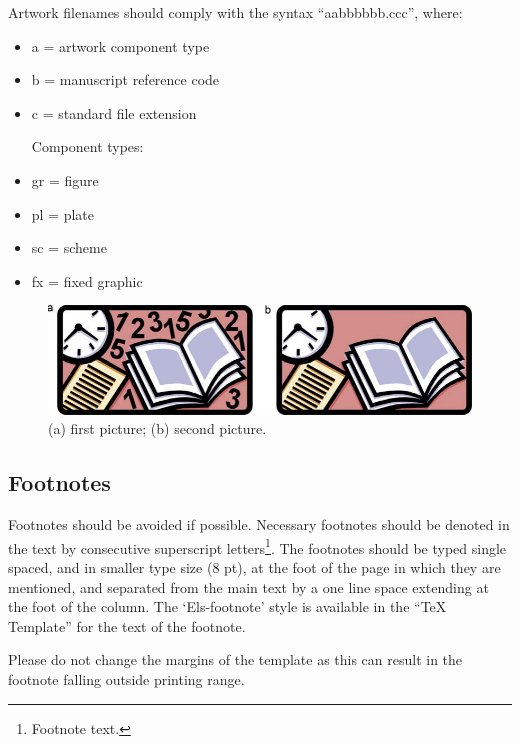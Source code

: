 \documentclass[5p,times,procedia]{elsarticle}
\begin{document}
Artwork filenames should comply with the syntax ``aabbbbbb.ccc'', where:
\begin{itemize}
\item a = artwork component type
\item b = manuscript reference code
\item c = standard file extension

Component types:
\item gr = figure
\item pl = plate
\item sc = scheme
\item fx = fixed graphic
\end{itemize}

\begin{figure}[t]\vspace*{4pt}
\centerline{\includegraphics{gr1}}
\caption{(a) first picture; (b) second picture.}
\end{figure}


\subsection{Footnotes}
Footnotes should be avoided if possible. Necessary footnotes should be denoted in the text by consecutive superscript letters\footnote{Footnote text.}. The footnotes should be typed single spaced, and in smaller type size (8 pt), at the foot of the page in which they are mentioned, and separated from the main text by a one line space extending at the foot of the column. The `Els-footnote' style is available in the ``TeX Template'' for the text of the footnote.

Please do not change the margins of the template as this can result in the footnote falling outside printing range.
\end{document}
